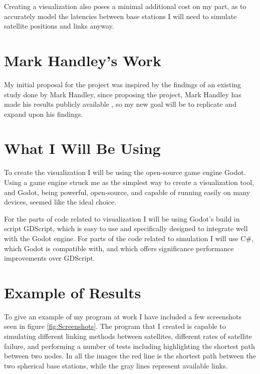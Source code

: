 \documentclass[12pt]{report}
\begin{document}
Creating a visualization also poses a minimal additional cost on my part, as to accurately model the latencies between base stations I will need to simulate satellite positions and links anyway.

\section{Mark Handley's Work}

My initial proposal for the project was inspired by the findings of an existing study done by Mark Handley, since proposing the project, Mark Handley has made his results publicly available \cite{OriginalReport}, so my new goal will be to replicate and expand upon his findings.

\section{What I Will Be Using}
To create the visualization I will be using the open-source game engine Godot. Using a game engine struck me as the simplest way to create a visualization tool, and Godot, being powerful, open-source, and capable of running easily on many devices, seemed like the ideal choice.

For the parts of code related to visualization I will be using Godot's build in script GDScript, which is easy to use and specifically designed to integrate well with the Godot engine. For parts of the code related to simulation I will use C\#, which Godot is compatible with, and which offers significance performance improvements over GDScript.

\section{Example of Results}
To give an example of my program at work I have included a few screenshots seen in figure \ref{fig:Screenshots}. The program that I created is capable to simulating different linking methods between satellites, different rates of satellite failure, and performing a number of tests including highlighting the shortest path between two nodes. In all the images the red line is the shortest path between the two spherical base stations, while the gray lines represent available links.
\end{document}
